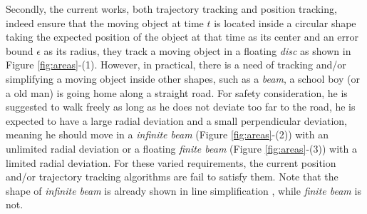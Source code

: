 Secondly, the current works, both trajectory tracking and position tracking, indeed ensure that the moving object at time $t$ is located inside a circular shape taking the expected position of the object at that time as its center and an error bound $\epsilon$ as its radius, \ie they track a moving object in a floating \emph{disc} as shown in Figure \ref{fig:areas}-(1). 
%
However, in practical, there is a need of tracking and/or simplifying a moving object inside other shapes, such as a \emph{beam}, \eg a school boy (or a old man) is going home along a straight road. For safety consideration, he is suggested to walk freely as long as he does not deviate too far to the road, \ie he is expected to have a large radial deviation and a small perpendicular deviation, meaning he should move in a \emph{infinite beam} \cite{Chen:Space,Daescu:metric} (Figure \ref{fig:areas}-(2)) with an unlimited radial deviation or a floating \emph{finite beam} (Figure \ref{fig:areas}-(3)) with a limited radial deviation.
%
For these varied requirements, the current position and/or trajectory tracking algorithms are fail to satisfy them. Note that the shape of \emph{infinite beam} is already shown in line simplification \cite{Chen:Space,Daescu:metric}, while \emph{finite beam} is not.




